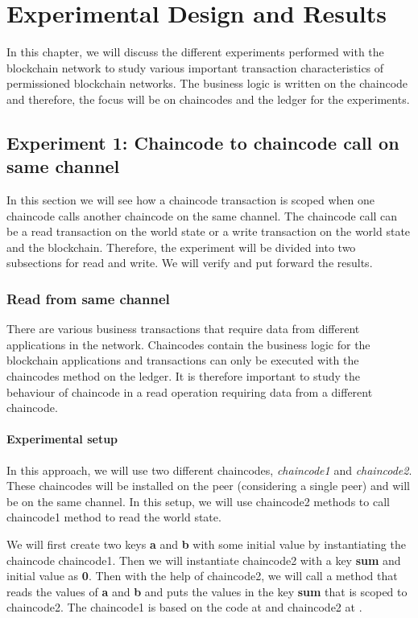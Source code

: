 \documentclass[
  a4paper,  %
  twoside,  %
  bibliography=totoc,
  headsepline,
  cleardoublepage=empty,
  parskip=half,
  draft=false
]{scrbook}
\begin{document}
\chapter{Experimental Design and Results}
In this chapter, we will discuss the different experiments performed with the blockchain network to study various important transaction characteristics of permissioned blockchain networks. The business logic is written on the chaincode and therefore, the focus will be on chaincodes and the ledger for the experiments. 
\label{chap:de}

\section{Experiment 1: Chaincode to chaincode call on same channel}
\label{sec:exp1}
In this section we will see how a chaincode transaction is scoped when one chaincode calls another chaincode on the same channel. The chaincode call can be a read transaction on the world state or a write transaction on the world state and the blockchain. Therefore, the experiment will be divided into two subsections for read and write. We will verify and put forward the results.

\subsection{Read from same channel}
\label{sec:read}
There are various business transactions that require data from different applications in the network. Chaincodes contain the business logic for the blockchain applications and transactions can only be executed with the chaincodes method on the ledger. It is therefore important to study the behaviour of chaincode in a read operation requiring data from a different chaincode. 
\subsubsection{Experimental setup}
In this approach, we will use two different chaincodes, \textit{chaincode1} and \textit{chaincode2}. These chaincodes will be installed on the peer (considering a single peer) and will be on the same channel. In this setup, we will use chaincode2 methods to call chaincode1 method to read the world state. 

We will first create two keys \textbf{a} and \textbf{b} with some initial value by instantiating the chaincode chaincode1. Then we will instantiate chaincode2 with a key \textbf{sum} and initial value as \textbf{0}. Then with the help of chaincode2, we will call a method that reads the values of \textbf{a} and \textbf{b} and puts the values in the key \textbf{sum} that is scoped to chaincode2. The chaincode1 is based on the code at \cite{ce2} and chaincode2 at \cite{ce5}. 
\end{document}
